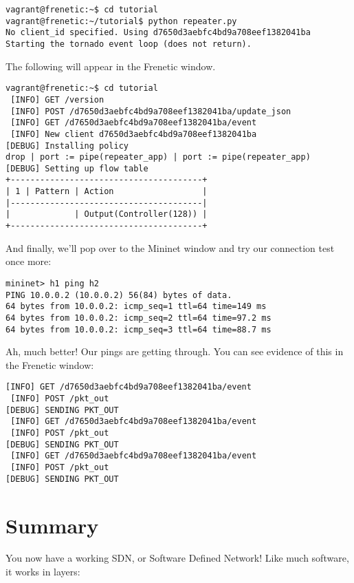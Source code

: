 \begin{lstlisting}[style=BashInputStyle]vagrant@frenetic:~$ cd tutorial
vagrant@frenetic:~/tutorial$ python repeater.py
No client_id specified. Using d7650d3aebfc4bd9a708eef1382041ba
Starting the tornado event loop (does not return).
\end{lstlisting}

The following will appear in the Frenetic window.  

\begin{lstlisting}[style=BashInputStyle]vagrant@frenetic:~$ cd tutorial
 [INFO] GET /version
 [INFO] POST /d7650d3aebfc4bd9a708eef1382041ba/update_json
 [INFO] GET /d7650d3aebfc4bd9a708eef1382041ba/event
 [INFO] New client d7650d3aebfc4bd9a708eef1382041ba
[DEBUG] Installing policy
drop | port := pipe(repeater_app) | port := pipe(repeater_app)
[DEBUG] Setting up flow table
+---------------------------------------+
| 1 | Pattern | Action                  |
|---------------------------------------|
|             | Output(Controller(128)) |
+---------------------------------------+
\end{lstlisting}

And finally, we'll pop over to the Mininet window and try our connection test once more:

\begin{lstlisting}[style=BashInputStyle]
mininet> h1 ping h2
PING 10.0.0.2 (10.0.0.2) 56(84) bytes of data.
64 bytes from 10.0.0.2: icmp_seq=1 ttl=64 time=149 ms
64 bytes from 10.0.0.2: icmp_seq=2 ttl=64 time=97.2 ms
64 bytes from 10.0.0.2: icmp_seq=3 ttl=64 time=88.7 ms
\end{lstlisting}

Ah, much better! 
Our pings are getting through.  
You can see evidence of this in the Frenetic window:

\begin{lstlisting}[style=BashInputStyle]
 [INFO] GET /d7650d3aebfc4bd9a708eef1382041ba/event
 [INFO] POST /pkt_out
[DEBUG] SENDING PKT_OUT
 [INFO] GET /d7650d3aebfc4bd9a708eef1382041ba/event
 [INFO] POST /pkt_out
[DEBUG] SENDING PKT_OUT
 [INFO] GET /d7650d3aebfc4bd9a708eef1382041ba/event
 [INFO] POST /pkt_out
[DEBUG] SENDING PKT_OUT
\end{lstlisting}

\section{Summary}

You now have a working SDN, or Software Defined Network!   Like much software, it works in layers:


